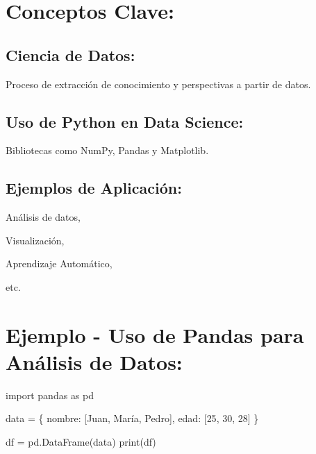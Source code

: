 \documentclass[
  a4paper,
  onepage,
  openany]{scrreprt}
\newenvironment{Shaded}{\begin{snugshade}}{\end{snugshade}}
\newcommand{\BuiltInTok}[1]{\textcolor[rgb]{0.00,0.23,0.31}{#1}}
\newcommand{\DecValTok}[1]{\textcolor[rgb]{0.68,0.00,0.00}{#1}}
\newcommand{\ImportTok}[1]{\textcolor[rgb]{0.00,0.46,0.62}{#1}}
\newcommand{\NormalTok}[1]{\textcolor[rgb]{0.00,0.23,0.31}{#1}}
\newcommand{\OperatorTok}[1]{\textcolor[rgb]{0.37,0.37,0.37}{#1}}
\newcommand{\StringTok}[1]{\textcolor[rgb]{0.13,0.47,0.30}{#1}}
\begin{document}
\hypertarget{conceptos-clave-63}{%
\section{Conceptos Clave:}\label{conceptos-clave-63}}

\hypertarget{ciencia-de-datos-1}{%
\subsection{Ciencia de Datos:}\label{ciencia-de-datos-1}}

Proceso de extracción de conocimiento y perspectivas a partir de datos.

\hypertarget{uso-de-python-en-data-science-1}{%
\subsection{Uso de Python en Data
Science:}\label{uso-de-python-en-data-science-1}}

Bibliotecas como NumPy, Pandas y Matplotlib.

\hypertarget{ejemplos-de-aplicaciuxf3n-1}{%
\subsection{Ejemplos de Aplicación:}\label{ejemplos-de-aplicaciuxf3n-1}}

Análisis de datos,

Visualización,

Aprendizaje Automático,

etc.

\hypertarget{ejemplo---uso-de-pandas-para-anuxe1lisis-de-datos-1}{%
\section{Ejemplo - Uso de Pandas para Análisis de
Datos:}\label{ejemplo---uso-de-pandas-para-anuxe1lisis-de-datos-1}}

\begin{Shaded}
\begin{Highlighting}[]
\ImportTok{import}\NormalTok{ pandas }\ImportTok{as}\NormalTok{ pd}

\NormalTok{data }\OperatorTok{=}\NormalTok{ \{}
    \StringTok{\textquotesingle{}nombre\textquotesingle{}}\NormalTok{: [}\StringTok{\textquotesingle{}Juan\textquotesingle{}}\NormalTok{, }\StringTok{\textquotesingle{}María\textquotesingle{}}\NormalTok{, }\StringTok{\textquotesingle{}Pedro\textquotesingle{}}\NormalTok{],}
    \StringTok{\textquotesingle{}edad\textquotesingle{}}\NormalTok{: [}\DecValTok{25}\NormalTok{, }\DecValTok{30}\NormalTok{, }\DecValTok{28}\NormalTok{]}
\NormalTok{\}}

\NormalTok{df }\OperatorTok{=}\NormalTok{ pd.DataFrame(data)}
\BuiltInTok{print}\NormalTok{(df)}
\end{Highlighting}
\end{Shaded}
\end{document}
